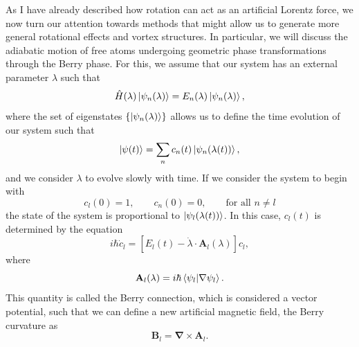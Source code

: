 As I have already described how rotation can act as an artificial Lorentz force, we now turn our attention towards methods that might allow us to generate more general rotational effects and vortex structures.
In particular, we will discuss the adiabatic motion of free atoms undergoing geometric phase transformations through the Berry phase. 
For this, we assume that our system has an external parameter $\lambda$ such that
\begin{equation}
\hat H(\lambda) \ket{\psi_n(\lambda)} = E_n(\lambda)\ket{\psi_n(\lambda)},
\end{equation}
where the set of eigenstates $\left\{ \ket{\psi_n(\lambda)} \right\}$ allows us to define the time evolution of our system such that
\begin{equation}
\ket{\psi(t)} = \sum_n c_n(t) \ket{\psi_n(\lambda(t))},
\end{equation}
and we consider $\lambda$ to evolve slowly with time. If we consider the system to begin with
\begin{equation}
c_l(0) = 1,
\qquad
c_n(0) = 0, 
\qquad
\text{for all } n\neq l
\end{equation}
the state of the system is proportional to $\ket{\psi_l(\lambda(t))}$.
In this case, $c_l(t)$ is determined by the equation
\begin{equation}
i \hbar \dot{c}_l =  [E_l(t) - \dot{\lambda} \cdot \mathbf{A}_l(\lambda)]c_l,
\label{Bcnx-1}
\end{equation}
where 
\begin{equation}
\mathbf{A}_l(\lambda) = i \hbar \braket{\psi_l|\nabla\psi_l}.
\label{eqn:Bcnx}
\end{equation}
This quantity is called the Berry connection, which is considered a vector potential, such that we can define a new artificial magnetic field, the Berry curvature as
\begin{equation}
\mathbf{B}_l = \mathbf{\nabla} \times \mathbf{A}_l.
\label{eqn:BC}
\end{equation}

